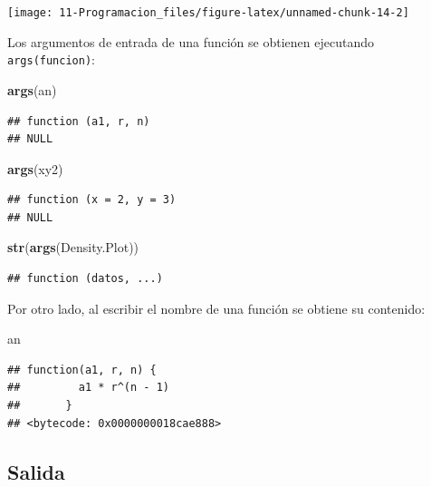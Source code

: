 \documentclass[]{book}
\newenvironment{Shaded}{\begin{snugshade}}{\end{snugshade}}
\newcommand{\KeywordTok}[1]{\textcolor[rgb]{0.13,0.29,0.53}{\textbf{#1}}}
\newcommand{\NormalTok}[1]{#1}
\begin{document}
\begin{center}\texttt{[image: 11-Programacion\_files/figure-latex/unnamed-chunk-14-2]} \end{center}

Los argumentos de entrada de una función se obtienen ejecutando
\texttt{args(funcion)}:

\begin{Shaded}
\begin{Highlighting}[]
\KeywordTok{args}\NormalTok{(an)}
\end{Highlighting}
\end{Shaded}

\begin{verbatim}
## function (a1, r, n) 
## NULL
\end{verbatim}

\begin{Shaded}
\begin{Highlighting}[]
\KeywordTok{args}\NormalTok{(xy2)}
\end{Highlighting}
\end{Shaded}

\begin{verbatim}
## function (x = 2, y = 3) 
## NULL
\end{verbatim}

\begin{Shaded}
\begin{Highlighting}[]
\KeywordTok{str}\NormalTok{(}\KeywordTok{args}\NormalTok{(Density.Plot))}
\end{Highlighting}
\end{Shaded}

\begin{verbatim}
## function (datos, ...)
\end{verbatim}

Por otro lado, al escribir el nombre de una función se obtiene su
contenido:

\begin{Shaded}
\begin{Highlighting}[]
\NormalTok{an}
\end{Highlighting}
\end{Shaded}

\begin{verbatim}
## function(a1, r, n) {
##         a1 * r^(n - 1)
##       }
## <bytecode: 0x0000000018cae888>
\end{verbatim}

\subsection{Salida}\label{salida}
\end{document}

